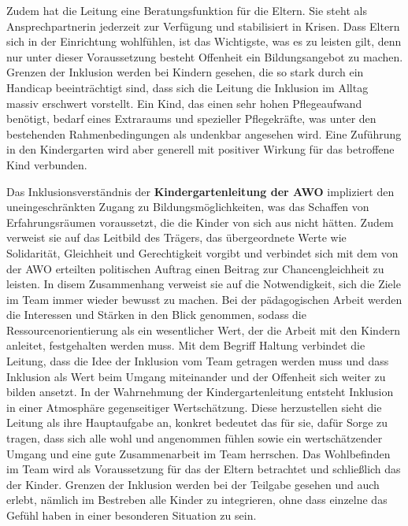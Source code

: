 Zudem hat die Leitung eine Beratungsfunktion für die Eltern. Sie steht als Ansprechpartnerin jederzeit zur Verfügung und stabilisiert in Krisen. Dass Eltern sich in der Einrichtung wohlfühlen, ist das Wichtigste, was es zu leisten gilt, denn nur unter dieser Voraussetzung besteht Offenheit ein Bildungsangebot zu machen. 
Grenzen der Inklusion werden bei Kindern gesehen, die so stark durch ein Handicap beeinträchtigt sind, dass sich die Leitung die Inklusion im Alltag massiv erschwert vorstellt. Ein Kind, das einen sehr hohen Pflegeaufwand benötigt, bedarf eines Extraraums und spezieller Pflegekräfte, was unter den bestehenden Rahmenbedingungen als undenkbar angesehen wird. Eine Zuführung in den Kindergarten wird aber generell mit positiver Wirkung für das betroffene Kind verbunden.

Das Inklusionsverständnis der \textbf{Kindergartenleitung der AWO} impliziert den uneingeschränkten Zugang zu Bildungsmöglichkeiten, was das Schaffen von Erfahrungsräumen voraussetzt, die die Kinder von sich aus nicht hätten. Zudem verweist sie auf das Leitbild des Trägers, das übergeordnete Werte wie Solidarität, Gleichheit und Gerechtigkeit vorgibt und verbindet sich mit dem von der AWO erteilten politischen Auftrag einen Beitrag zur Chancengleichheit zu leisten. In disem Zusammenhang verweist sie auf die Notwendigkeit, sich die Ziele im Team immer wieder bewusst zu machen. Bei der pädagogischen Arbeit werden die Interessen und Stärken in den Blick genommen, sodass die Ressourcenorientierung als ein wesentlicher Wert, der die Arbeit mit den Kindern anleitet, festgehalten werden muss. 
Mit dem Begriff Haltung verbindet die Leitung, dass die Idee der Inklusion vom Team getragen werden muss und dass Inklusion als Wert  beim Umgang miteinander und der Offenheit sich weiter zu bilden ansetzt. In der Wahrnehmung der Kindergartenleitung entsteht Inklusion in einer Atmosphäre gegenseitiger Wertschätzung. Diese herzustellen sieht die Leitung als ihre Hauptaufgabe an, konkret bedeutet das für sie, dafür Sorge zu tragen, dass sich alle wohl und angenommen fühlen sowie ein wertschätzender Umgang und eine gute Zusammenarbeit im Team herrschen. Das Wohlbefinden im Team wird als Voraussetzung für das der Eltern betrachtet und schließlich das der Kinder. 
Grenzen der Inklusion werden bei der Teilgabe gesehen und auch erlebt, nämlich im Bestreben alle Kinder zu integrieren, ohne dass einzelne das Gefühl haben in einer besonderen Situation zu sein.    
